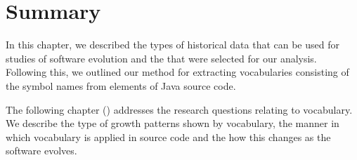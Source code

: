 


\section{Summary} %
\label{sec:summary}

In this chapter, we described the types of historical data that can be used for studies of software evolution and the {\OSYS} that were selected for our analysis. Following this, we outlined our method for extracting vocabularies consisting of the symbol names from elements of Java source code.

The following chapter () addresses the research questions relating to vocabulary. We describe the type of growth patterns shown by vocabulary, the manner in which vocabulary is applied in source code and the how this changes as the software evolves.


